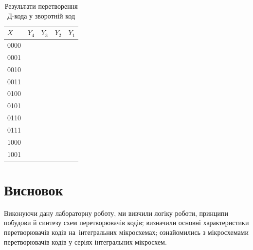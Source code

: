 \documentclass[a4paper,oneside,DIV=12,12pt,headings=normal]{scrartcl}
\begin{document}
			\begin{table}[!htbp]
				\centering
				\begin{tabular}{l*{4}{r}}
					\toprule
						$X$  & $Y_4$ & $Y_3$ & $Y_2$ & $Y_1$ \\
					\midrule
						0000 &       &       &       & \\
						0001 &       &       &       & \\
						0010 &       &       &       & \\
						0011 &       &       &       & \\
						0100 &       &       &       & \\
						0101 &       &       &       & \\
						0110 &       &       &       & \\
						0111 &       &       &       & \\
						1000 &       &       &       & \\
						1001 &       &       &       & \\
					\bottomrule
				\end{tabular}
				\caption{Результати перетворення Д-кода у зворотній код}
				\label{tab:05-d-code-transformation}
			\end{table}


	\section{Висновок}
		Виконуючи дану лабораторну роботу, ми вивчили логіку роботи, принципи побудови й синтезу схем перетворювачів кодів; визначили основні характеристики перетворювачів кодів на~інтегральних мікросхемах; ознайомились з мікросхемами перетворювачів кодів у серіях інтегральних мікросхем.
\end{document}
